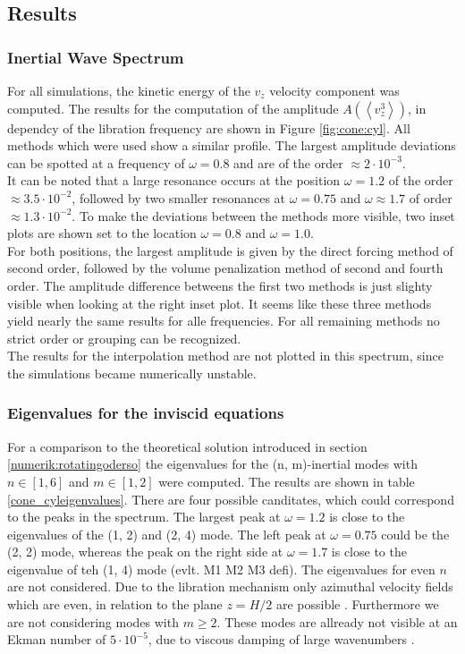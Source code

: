 \subsection{Results}
\subsubsection{Inertial Wave Spectrum}

For all simulations, the kinetic energy of the $v_z$ velocity component was computed.
The results for the computation of the amplitude $A\left(\left<v_z^3\right>\right)$, in dependcy of the libration
frequency are shown in Figure \ref{fig:cone:cyl}.
All methods which were used show a similar profile.
The largest amplitude deviations can be spotted at a frequency of $\omega=0.8$ and are of the order $\approx2\cdot10^{-3}$.\\
It can be noted that a large resonance  occurs at the position $\omega=1.2$ of the order $\approx3.5\cdot10^{-2}$, followed by two
smaller resonances at $\omega=0.75$ and $\omega\approx1.7$ of order $\approx1.3\cdot10^{-2}$.
To make the deviations between the methods more visible, two inset plots are shown
set to the location $\omega=0.8$ and $\omega=1.0$.\\
For both positions, the largest amplitude is given by the direct forcing method of second order, followed by
the volume penalization method of second and fourth order.
The amplitude difference betweens the first two methods is just slighty visible when looking at the right inset plot.
It seems like these three methods yield nearly the same results for alle frequencies.
For all remaining methods  no strict order or grouping can be recognized.\\
The results for the interpolation method are not plotted in this spectrum, since the simulations became numerically unstable.

\subsubsection{Eigenvalues for the inviscid equations}

For a comparison to the theoretical solution introduced in section \ref{numerik:rotatingoderso}
the eigenvalues for the (n, m)-inertial modes with $n\in[1,6]$ and $m\in[1, 2]$ were  computed.
The results are shown in table \ref{cone_cyleigenvalues}.
There are four possible canditates,  which could correspond to the peaks in the spectrum.
The largest peak at $\omega=1.2$ is close to the eigenvalues of the (1, 2) and (2, 4) mode.
The left peak at $\omega=0.75$ could be the (2, 2) mode,
whereas the peak on the right side at $\omega=1.7$ is close to the eigenvalue of teh (1, 4) mode (evlt. M1 M2 M3 defi).
The eigenvalues for even $n$ are not considered. Due to the libration mechanism only azimuthal velocity fields which are even,
in relation to the plane $z=H/2$ are possible \citep{Sauret2012}.
Furthermore we are not considering modes with $m\geq2$. These modes are allready not visible at an Ekman number of $5\cdot10^{-5}$,
due to viscous damping of large wavenumbers \citep{Sauret2012} .

